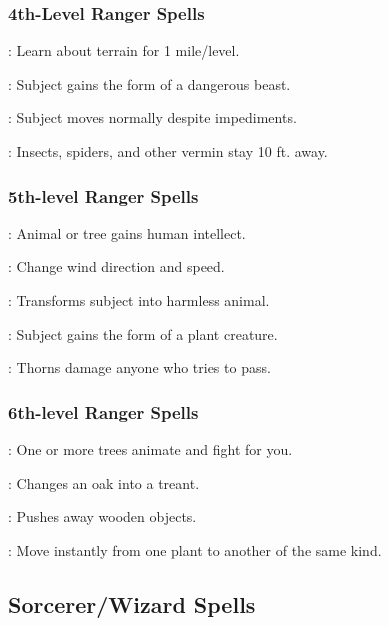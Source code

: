 \subsubsection{4th-Level Ranger Spells}
\begin{list}{}{\leftmargin=1em}
\item {}: Learn about terrain for 1 mile/level.
\item {}: Subject gains the form of a dangerous beast.
\item {}: Subject moves normally despite impediments.
\item {}: Insects, spiders, and other vermin stay 10 ft. away.
\end{list}
\subsubsection{5th-level Ranger Spells}
\begin{list}{}{\leftmargin=1em}
\item {}: Animal or tree gains human intellect.
\item {}: Change wind direction and speed.
\item {}: Transforms subject into harmless animal.
\item {}: Subject gains the form of a plant creature.
\item {}: Thorns damage anyone who tries to pass.
\end{list}
\subsubsection{6th-level Ranger Spells}
\begin{list}{}{\leftmargin=1em}
\item {}: One or more trees animate and fight for you.
\item {}: Changes an oak into a treant.
\item {}: Pushes away wooden objects.
\item {}: Move instantly from one plant to another of the same kind.
\end{list}
\subsection{Sorcerer/Wizard Spells}
